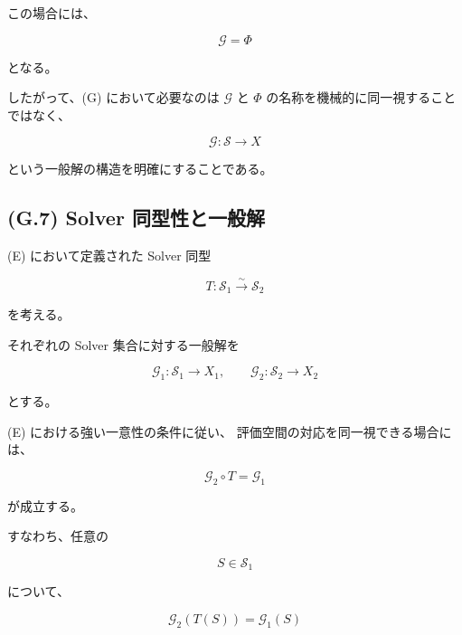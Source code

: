 \documentclass[a4paper,11pt]{article}
\begin{document}
この場合には、

\begin{equation}
    \mathcal{G}
    =
    \Phi
\end{equation}

となる。

したがって、(G) において必要なのは
$\mathcal{G}$ と $\Phi$ の名称を機械的に同一視することではなく、

\begin{equation}
    \boxed{
        \mathcal{G}:
        \mathcal{S}\to X
    }
\end{equation}

という一般解の構造を明確にすることである。


\subsection{(G.7) Solver 同型性と一般解}
\label{subsec:G7}

(E) において定義された Solver 同型

\begin{equation}
    T:
    \mathcal{S}_1
    \overset{\sim}{\longrightarrow}
    \mathcal{S}_2
\end{equation}

を考える。

それぞれの Solver 集合に対する一般解を

\begin{equation}
    \mathcal{G}_1:
    \mathcal{S}_1\to X_1,
    \qquad
    \mathcal{G}_2:
    \mathcal{S}_2\to X_2
\end{equation}

とする。

(E) における強い一意性の条件に従い、
評価空間の対応を同一視できる場合には、

\begin{equation}
    \boxed{
        \mathcal{G}_2\circ T
        =
        \mathcal{G}_1
    }
    \label{eq:G-isomorphism}
\end{equation}

が成立する。

すなわち、任意の

\begin{equation}
    S\in\mathcal{S}_1
\end{equation}

について、

\begin{equation}
    \mathcal{G}_2(T(S))
    =
    \mathcal{G}_1(S)
\end{equation}
\end{document}
